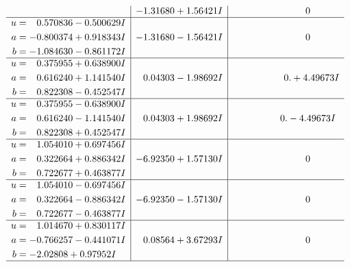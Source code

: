 \documentclass[1p]{elsarticle_modified}
\theoremstyle{definition}
\begin{document}
$$\begin{array}{c|c|c}
 & -1.31680 + 1.56421 I & \phantom{-0.000000 } 0 \\ \hline\begin{aligned}
u &= \phantom{-}0.570836 - 0.500629 I \\
a &= -0.800374 + 0.918343 I \\
b &= -1.084630 - 0.861172 I\end{aligned}
 & -1.31680 - 1.56421 I & \phantom{-0.000000 } 0 \\ \hline\begin{aligned}
u &= \phantom{-}0.375955 + 0.638900 I \\
a &= \phantom{-}0.616240 + 1.141540 I \\
b &= \phantom{-}0.822308 - 0.452547 I\end{aligned}
 & \phantom{-}0.04303 - 1.98692 I & \phantom{-0.000000 -}0. + 4.49673 I \\ \hline\begin{aligned}
u &= \phantom{-}0.375955 - 0.638900 I \\
a &= \phantom{-}0.616240 - 1.141540 I \\
b &= \phantom{-}0.822308 + 0.452547 I\end{aligned}
 & \phantom{-}0.04303 + 1.98692 I & \phantom{-0.000000 } 0. - 4.49673 I \\ \hline\begin{aligned}
u &= \phantom{-}1.054010 + 0.697456 I \\
a &= \phantom{-}0.322664 + 0.886342 I \\
b &= \phantom{-}0.722677 + 0.463877 I\end{aligned}
 & -6.92350 + 1.57130 I & \phantom{-0.000000 } 0 \\ \hline\begin{aligned}
u &= \phantom{-}1.054010 - 0.697456 I \\
a &= \phantom{-}0.322664 - 0.886342 I \\
b &= \phantom{-}0.722677 - 0.463877 I\end{aligned}
 & -6.92350 - 1.57130 I & \phantom{-0.000000 } 0 \\ \hline\begin{aligned}
u &= \phantom{-}1.014670 + 0.830117 I \\
a &= -0.766257 - 0.441071 I \\
b &= -2.02808 + 0.97952 I\end{aligned}
 & \phantom{-}0.08564 + 3.67293 I & \phantom{-0.000000 } 0\\
 \hline 
 \end{array}$$\newpage$$\begin{array}{c|c|c}  

\end{array}$$
\end{document}
